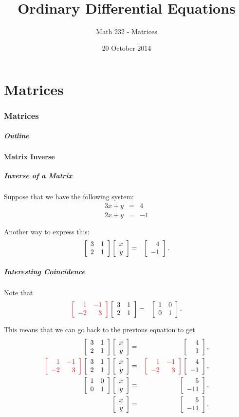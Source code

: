 \part{Matrices}
\section{Matrices}

\title{Ordinary Differential Equations}
\subtitle{Math 232 - Matrices}
\date{20 October 2014}

\begin{frame}
  \titlepage
\end{frame}

\begin{frame}
  \frametitle{Outline}
  \tableofcontents[ currentsection ]
\end{frame}


\subsection{Matrix Inverse}


\begin{frame}
  \frametitle{Inverse of a Matrix}

  Suppose that we have the following system:
  \begin{eqnarray*}
    3x + y & = & 4 \\
    2x + y & = & -1
  \end{eqnarray*}

  Another way to express this:
  \begin{eqnarray*}
    \arrayTwo{3}{1}{2}{1} \vecTwo{x}{y} & = & \vecTwo{4}{-1}.
  \end{eqnarray*}

\end{frame}


\begin{frame}
  \frametitle{Interesting Coincidence}

  Note that
  \begin{eqnarray*}
    \redText{\arrayTwo{1}{-1}{-2}{3}} \arrayTwo{3}{1}{2}{1}  & = & \arrayTwo{1}{0}{0}{1}.
  \end{eqnarray*}

  This means that we can go back to the previous equation to get
  \begin{eqnarray*}
    \arrayTwo{3}{1}{2}{1} \vecTwo{x}{y} & = & \vecTwo{4}{-1}, \\
    \redText{\arrayTwo{1}{-1}{-2}{3}} \arrayTwo{3}{1}{2}{1} \vecTwo{x}{y} & = &
          \redText{\arrayTwo{1}{-1}{-2}{3}}\vecTwo{4}{-1}, \\
    \arrayTwo{1}{0}{0}{1} \vecTwo{x}{y} & = & \vecTwo{5}{-11}, \\
    \vecTwo{x}{y} & = & \vecTwo{5}{-11}.
  \end{eqnarray*}


\end{frame}

